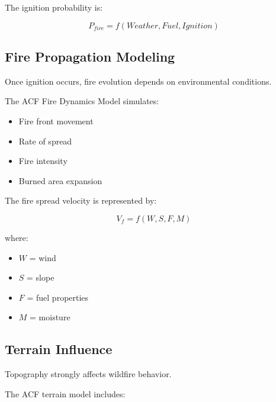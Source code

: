 The ignition probability is:

\[
P_{fire}
=
f(Weather,Fuel,Ignition)
\]



\subsection{Fire Propagation Modeling}

Once ignition occurs, fire evolution depends on environmental
conditions.

The ACF Fire Dynamics Model simulates:

\begin{itemize}

\item Fire front movement

\item Rate of spread

\item Fire intensity

\item Burned area expansion

\end{itemize}


The fire spread velocity is represented by:

\[
V_f=f(W,S,F,M)
\]


where:

\begin{itemize}

\item $W$ = wind

\item $S$ = slope

\item $F$ = fuel properties

\item $M$ = moisture

\end{itemize}



\subsection{Terrain Influence}

Topography strongly affects wildfire behavior.

The ACF terrain model includes:

